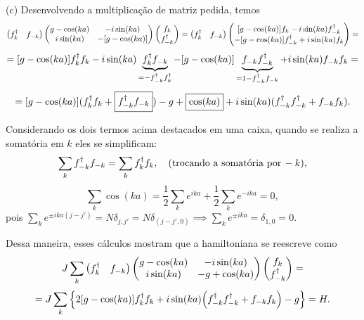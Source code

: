 \documentclass[a4paper,10pt]{article}
\begin{document}
(c) Desenvolvendo a multiplicação de matriz pedida, temos
$$
\begin{pmatrix}
f_k^\dagger & f_{-k}
\end{pmatrix}
\begin{pmatrix}
g-\cos(ka) & -i\sin(ka) \\
i\sin(ka) & -[g-\cos(ka)]
\end{pmatrix}
\begin{pmatrix}
f_k \\ f_{-k}^\dagger
\end{pmatrix}
=
\begin{pmatrix}
f_k^\dagger & f_{-k}
\end{pmatrix}
\begin{pmatrix}
[g-\cos(ka)] f_k - i \sin(ka) f_{-k}^\dagger \\ -[g-\cos(ka)] f_{-k}^\dagger + i \sin(ka) f_k
\end{pmatrix}
=
$$
$$
=
[g-\cos(ka)] f_k^\dagger f_k - i\sin(ka) \underbrace{f_k^\dagger f_{-k}}_{=-f_{-k}^\dagger f_k^\dagger}
- [g-\cos(ka)] \underbrace{f_{-k} f_{-k}^\dagger}_{=1-f_{-k}^\dagger f_{-k}} + i \sin(ka) f_{-k} f_k =
$$
$$
=
[g-\cos(ka)] (f_k^\dagger f_k + \boxed{f_{-k}^\dagger f_{-k}}) - g + \boxed{\cos(ka)} + i\sin(ka) (f_{-k}^\dagger f_{-k}^\dagger + f_{-k} f_k).
$$

Considerando os dois termos acima destacados em uma caixa, quando se realiza a somatória em $k$ eles se simplificam:
$$
\sum_{k} f_{-k}^\dagger f_{-k} = \sum_{k} f_{k}^\dagger f_k, \quad (\text{trocando a somatória por} \, -k),
$$
$$
\sum_{k} \cos(ka) = \frac{1}{2} \sum_{k} e^{ika} + \frac{1}{2} \sum_{k} e^{-ika} = 0,
$$
pois $\sum_{k} e^{\pm ika(j-j')} = N \delta_{j,j'} = N \delta_{(j-j', 0)} \implies \sum_{k} e^{\pm ika} = \delta_{1,0} = 0$.

\n

Dessa maneira, esses cálculos mostram que a hamiltoniana se reescreve como
$$
J \sum_{k}
\begin{pmatrix}
f_k^\dagger & f_{-k}
\end{pmatrix}
\begin{pmatrix}
g-\cos(ka) & -i\sin(ka) \\
i\sin(ka) & -g+\cos(ka)
\end{pmatrix}
\begin{pmatrix}
f_k \\ f_{-k}^\dagger
\end{pmatrix}
=
$$
$$
= J \sum_{k} \qty{ 2[g-\cos(ka)] f_k^\dagger f_k + i\sin(ka) \Big(f_{-k}^\dagger f_{-k}^\dagger+ f_{-k} f_k\Big) - g } =
H.
$$

\n
\end{document}
